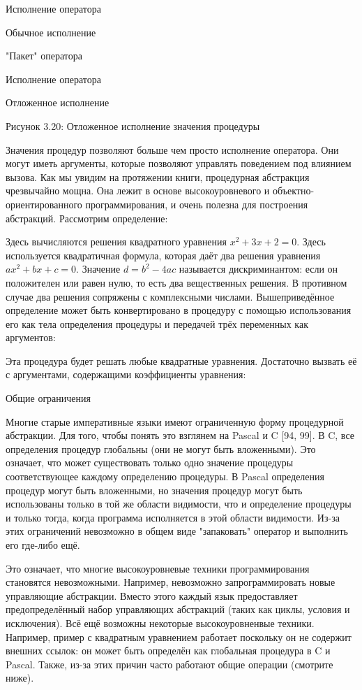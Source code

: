 Исполнение оператора

Обычное исполнение

"Пакет" оператора

Исполнение оператора

Отложенное исполнение

Рисунок 3.20: Отложенное исполнение значения процедуры

Значения процедур позволяют больше чем просто исполнение оператора. Они могут иметь аргументы, которые позволяют управлять поведением под влиянием вызова. Как мы увидим на протяжении книги, процедурная абстракция чрезвычайно мощна. Она лежит в основе высокоуровневого и объектно-ориентированного программирования, и очень полезна для построения абстракций. Рассмотрим определение:

Здесь вычисляются решения квадратного уравнения $x^2 + 3x + 2 = 0$. Здесь используется квадратичная формула, которая даёт два решения уравнения $ax^2 + bx + c = 0$. Значение $d = b^2 - 4ac$ называется дискриминантом: если он положителен или равен нулю, то есть два вещественных решения. В противном случае два решения сопряжены с комплексными числами. Вышеприведённое определение может быть конвертировано в процедуру с помощью использования его как тела определения процедуры и передачей трёх переменных как аргументов:

Эта процедура будет решать любые квадратные уравнения. Достаточно вызвать её с аргументами, содержащими коэффициенты уравнения:

Общие ограничения

Многие старые императивные языки имеют ограниченную форму процедурной абстракции. Для того, чтобы понять это взглянем на Pascal и C [94, 99]. В C, все определения процедур глобальны (они не могут быть вложенными). Это означает, что может существовать только одно значение процедуры соответствующее каждому определению процедуры. В Pascal определения процедур могут быть вложенными, но значения процедур могут быть использованы только в той же области видимости, что и определение процедуры и только тогда, когда программа исполняется в этой области видимости. Из-за этих ограничений невозможно в общем виде "запаковать" оператор и выполнить его где-либо ещё.

Это означает, что многие высокоуровневые техники программирования становятся невозможными. Например, невозможно запрограммировать новые управляющие абстракции. Вместо этого каждый язык предоставляет предопределённый набор управляющих абстракций (таких как циклы, условия и исключения). Всё ещё возможны некоторые высокоуровненвые техники. Например, пример с квадратным уравнением работает поскольку он не содержит внешних ссылок: он может быть определён как глобальная процедура в C и Pascal. Также, из-за этих причин часто работают общие операции (смотрите ниже).

